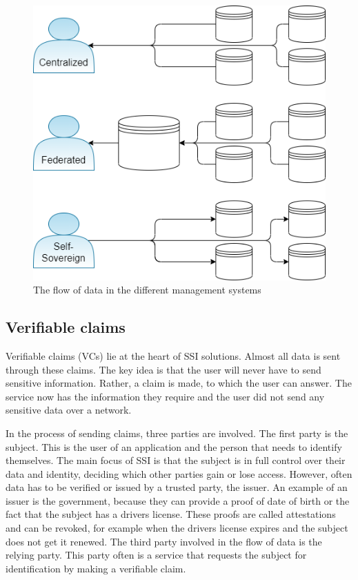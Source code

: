 \begin{figure}[h]
\centering
\includegraphics[scale=0.48]{figures/federated.png}
\vspace{-0.3cm}
\caption{The flow of data in the different management systems}
\label{fig:attestations}
\end{figure}

\subsection{Verifiable claims}
Verifiable claims (VCs) lie at the heart of SSI solutions. Almost all data is sent through these claims. The key idea is that the user will never have to send sensitive information. Rather, a claim is made, to which the user can answer. The service now has the information they require and the user did not send any sensitive data over a network.  

In the process of sending claims, three parties are involved. The first party is the subject. This is the user of an application and the person that needs to identify themselves. The main focus of SSI is that the subject is in full control over their data and identity, deciding which other parties gain or lose access. However, often data has to be verified or issued by a trusted party, the issuer. An example of an issuer is the government, because they can provide a proof of date of birth or the fact that the subject has a drivers license. These proofs are called attestations and can be revoked, for example when the drivers license expires and the subject does not get it renewed. The third party involved in the flow of data is the relying party. This party often is a service that requests the subject for identification by making a verifiable claim.

